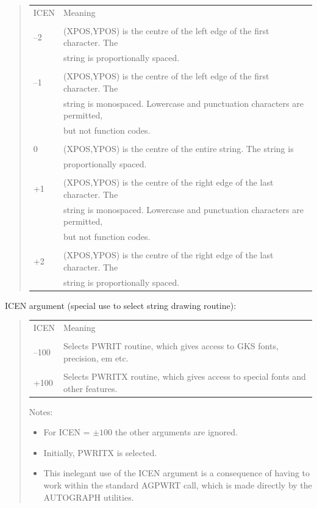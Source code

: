\documentclass[twoside,11pt]{article}
\renewcommand{\_}{\texttt{\symbol{95}}}
\begin{document}
\begin{quote}
\begin{tabular}{ll}
ICEN & Meaning\\
\\
--2 & (XPOS,YPOS) is the centre of the left edge of the first character.  The\\
 & string is proportionally spaced.\\
\\
--1 & (XPOS,YPOS) is the centre of the left edge of the first character.  The\\
 & string is monospaced.  Lowercase and punctuation characters are permitted,\\
 & but not function codes.\\
\\
0 & (XPOS,YPOS) is the centre of the entire string.  The string is\\
 & proportionally spaced.\\
\\
+1 & (XPOS,YPOS) is the centre of the right edge of the last character.  The\\
 & string is monospaced.  Lowercase and punctuation characters are permitted,\\
 & but not function codes.\\
\\
+2 & (XPOS,YPOS) is the centre of the right edge of the last character.  The\\
 & string is proportionally spaced.\\
\end{tabular}
\end{quote}

ICEN argument (special use to select string drawing routine):

\begin{quote}
\begin{tabular}{ll}
ICEN & Meaning\\
\\
--100 & Selects PWRIT routine, which gives access to GKS fonts, precision,
{em etc.}\\
\\
+100 & Selects PWRITX routine, which gives access to special fonts and other
features.
\end{tabular}

Notes:

\begin{itemize}
\item For ICEN = $\pm100$ the other arguments are ignored.
\item Initially, PWRITX is selected.
\item This inelegant use of the ICEN argument is a consequence
of having to work within the standard AGPWRT call, which
is made directly by the AUTOGRAPH utilities.
\end{itemize}
\end{quote}
\end{document}
